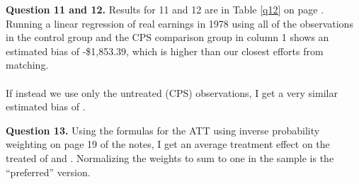 \documentclass[12pt]{article}
\begin{document}
\newpage
\textbf{Question 11 and 12.}
Results for 11 and 12 are in Table \ref{q12} on page \pageref{q12}. Running a linear regression of real earnings in 1978 using all of the observations in the control group and the CPS comparison group in column 1 shows an estimated bias of -\$1,853.39, which is higher than our closest efforts from matching. 
\\\\
If instead we use only the untreated (CPS) observations, I get a very similar estimated bias of . %


	
\bigskip
\textbf{Question 13.} Using the formulas for the ATT using inverse probability weighting on page 19 of the notes, I get an average treatment effect on the treated of  and . Normalizing the weights to sum to one in the sample is the ``preferred'' version.  
\end{document}
